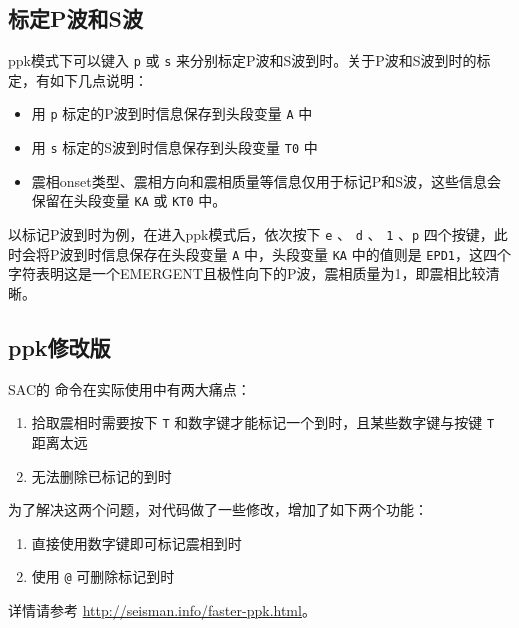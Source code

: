 \subsection{标定P波和S波}
ppk模式下可以键入 \texttt{p} 或 \texttt{s} 来分别标定P波和S波到时。关于P波和S波到时的标定，有如下几点说明：

\begin{itemize}
\item 用 \texttt{p} 标定的P波到时信息保存到头段变量 \texttt{A} 中
\item 用 \texttt{s} 标定的S波到时信息保存到头段变量 \texttt{T0} 中
\item 震相onset类型、震相方向和震相质量等信息仅用于标记P和S波，这些信息会保留在头段变量 \texttt{KA} 或 \texttt{KT0} 中。
\end{itemize}

以标记P波到时为例，在进入ppk模式后，依次按下 \texttt{e} 、 \texttt{d} 、 \texttt{1} 、\texttt{p} 四个按键，此时会将P波到时信息保存在头段变量 \texttt{A} 中，头段变量 \texttt{KA} 中的值则是 \texttt{EPD1}，这四个字符表明这是一个EMERGENT且极性向下的P波，震相质量为1，即震相比较清晰。

\subsection{ppk修改版}
SAC的  命令在实际使用中有两大痛点：
\begin{enumerate}
\item 拾取震相时需要按下 \texttt{T} 和数字键才能标记一个到时，且某些数字键与按键 \texttt{T} 距离太远
\item 无法删除已标记的到时
\end{enumerate}

为了解决这两个问题，对代码做了一些修改，增加了如下两个功能：
\begin{enumerate}
\item 直接使用数字键即可标记震相到时
\item 使用 \texttt{@} 可删除标记到时
\end{enumerate}

详情请参考 \url{http://seisman.info/faster-ppk.html}。
